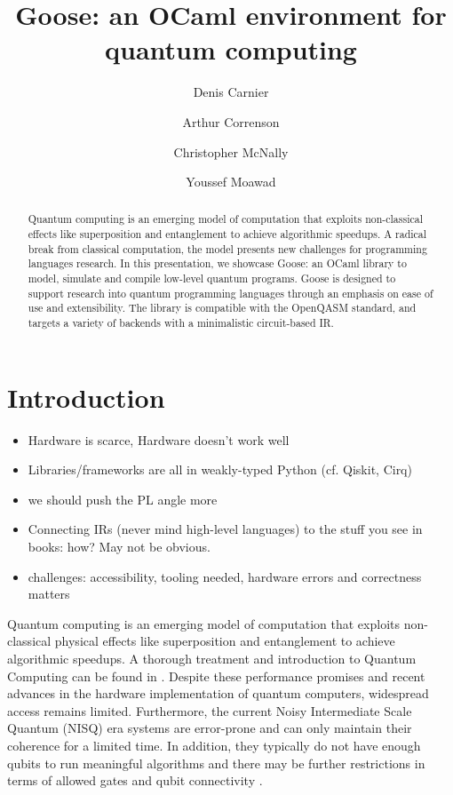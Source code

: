 \documentclass[a4paper]{easychair}
\title{Goose: an OCaml environment for quantum computing}
\author{
  Denis Carnier\inst{1}
  \and
  Arthur Correnson\inst{2}
  \and
  Christopher McNally\inst{3}
  \and
  Youssef Moawad\inst{4}
}
\institute{
  imec-DistriNet, KU Leuven
\and
  Ecole Normale Sup\'erieure de Rennes
\and
  Massachusetts Institute of Technology
\and
  University of Glasgow
}
\begin{document}
\maketitle

\begin{abstract}
Quantum computing is an emerging model of computation that exploits non-classical effects like superposition and entanglement to achieve algorithmic speedups. A radical break from classical computation, the model presents new challenges for programming languages research. In this presentation, we showcase Goose: an OCaml library to model, simulate and compile low-level quantum programs. Goose is designed to support research into quantum programming languages through an emphasis on ease of use and extensibility. The library is compatible with the OpenQASM standard, and targets a variety of backends with a minimalistic circuit-based IR.
\end{abstract}

\section{Introduction}

\begin{itemize}
\item Hardware is scarce, Hardware doesn't work well
\item Libraries/frameworks are all in weakly-typed Python (cf. Qiskit, Cirq)
\item we should push the PL angle more
\item Connecting IRs (never mind high-level languages) to the stuff you see in books: how? May not be obvious.
\item challenges: accessibility, tooling needed, hardware errors and correctness matters
\end{itemize}

\newcommand{\nisq}[0]{NISQ}

Quantum computing is an emerging model of computation that exploits non-classical physical effects like superposition and entanglement to achieve algorithmic speedups. A thorough treatment and introduction to Quantum Computing can be found in \cite{}. Despite these performance promises and recent advances in the hardware implementation of quantum computers, widespread access remains limited. Furthermore, the current Noisy Intermediate Scale Quantum (\nisq) \cite{} era systems are error-prone and can only maintain their coherence for a limited time. In addition, they typically do not have enough qubits to run meaningful algorithms and there may be further restrictions in terms of allowed gates and qubit connectivity \cite{}.
\end{document}
